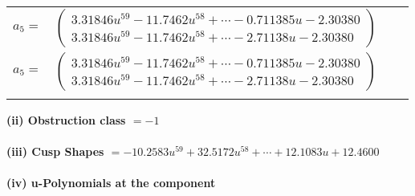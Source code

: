 \documentclass[1p]{elsarticle_modified}
\theoremstyle{definition}
\begin{document}
\begin{tabular}{m{7pt} m{180pt} m{7pt} m{180pt} }
\flushright $a_{5}=$&$\begin{pmatrix}3.31846 u^{59}-11.7462 u^{58}+\cdots-0.711385 u-2.30380\\3.31846 u^{59}-11.7462 u^{58}+\cdots-2.71138 u-2.30380\end{pmatrix}$\\ \flushright $a_{5}=$&$\begin{pmatrix}3.31846 u^{59}-11.7462 u^{58}+\cdots-0.711385 u-2.30380\\3.31846 u^{59}-11.7462 u^{58}+\cdots-2.71138 u-2.30380\end{pmatrix}$\\&\end{tabular}
\flushleft \textbf{(ii) Obstruction class $= -1$}\\~\\
\flushleft \textbf{(iii) Cusp Shapes $= -10.2583 u^{59}+32.5172 u^{58}+\cdots+12.1083 u+12.4600$}\\~\\
\newpage\renewcommand{\arraystretch}{1}
\flushleft \textbf{(iv) u-Polynomials at the component}\newline \\
\end{document}
